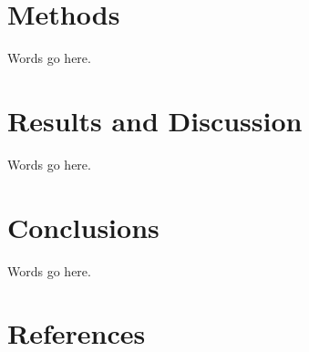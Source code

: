 \documentclass[]{elsarticle} %
\begin{document}
\hypertarget{methods}{%
\section{Methods}\label{methods}}

Words go here.

\hypertarget{results-and-discussion}{%
\section{Results and Discussion}\label{results-and-discussion}}

Words go here.

\hypertarget{conclusions}{%
\section{Conclusions}\label{conclusions}}

Words go here.

\hypertarget{references}{%
\section*{References}\label{references}}
\end{document}
